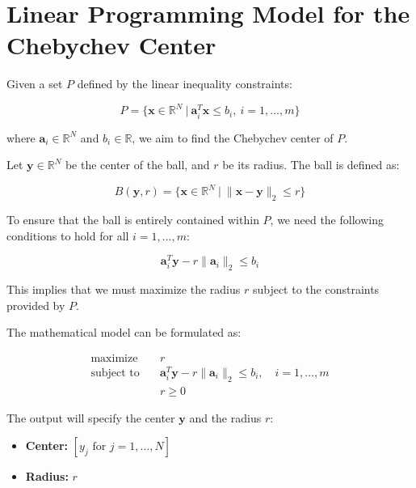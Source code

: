 \documentclass{article}
\begin{document}
\section*{Linear Programming Model for the Chebychev Center}

Given a set \( P \) defined by the linear inequality constraints:

\[
P = \{ \mathbf{x} \in \mathbb{R}^N \ | \ \mathbf{a}_i^T \mathbf{x} \leq b_i, \ i = 1, ..., m \}
\]

where \( \mathbf{a}_i \in \mathbb{R}^N \) and \( b_i \in \mathbb{R} \), we aim to find the Chebychev center of \( P \).

Let \( \mathbf{y} \in \mathbb{R}^N \) be the center of the ball, and \( r \) be its radius. The ball is defined as:

\[
B(\mathbf{y}, r) = \{ \mathbf{x} \in \mathbb{R}^N \ | \ \|\mathbf{x} - \mathbf{y}\|_2 \leq r \}
\]

To ensure that the ball is entirely contained within \( P \), we need the following conditions to hold for all \( i = 1, \ldots, m \):

\[
\mathbf{a}_i^T \mathbf{y} - r \|\mathbf{a}_i\|_2 \leq b_i
\]

This implies that we must maximize the radius \( r \) subject to the constraints provided by \( P \).

The mathematical model can be formulated as:

\begin{align*}
\text{maximize} \quad & r \\
\text{subject to} \quad & \mathbf{a}_i^T \mathbf{y} - r \|\mathbf{a}_i\|_2 \leq b_i, \quad i = 1, \ldots, m \\
& r \geq 0
\end{align*}

The output will specify the center \( \mathbf{y} \) and the radius \( r \):

\begin{itemize}
    \item \textbf{Center:} \( [y_j \text{ for } j = 1, \ldots, N] \)
    \item \textbf{Radius:} \( r \)
\end{itemize}
\end{document}
